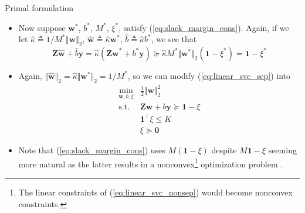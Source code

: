 \documentclass{beamer}
\numberwithin{equation}{section}
\newcommand{\aref}[1]{\alert{\ref{#1}}}
\begin{document}
\begin{frame}{Primal formulation}
    \begin{itemize}
        \item
        Now suppose $ \mathbf{w}^* $,  $ b^* $, $ M^* $, $ \xi^* $, satisfy
        (\aref{eq:slack_margin_cons}). Again, if we let $ \hat{\kappa}
        \triangleq 1 / M^*\Vert\mathbf{w}\Vert_2 $, $ \hat{\mathbf{w}}
        \triangleq \hat{\kappa}\mathbf{w}^* $, $ \hat{b} \triangleq
        \hat{\kappa}b^* $, we see that
        \begin{equation*}
            \mathbf{Z}\hat{\mathbf{w}} + \hat{b}\mathbf{y} =
            \hat{\kappa}(\mathbf{Zw}^* + b^*\mathbf{y}) \succeq
            \hat{\kappa}M^*\Vert\mathbf{w}^*\Vert_2(\mathbf{1} - \xi^*) =
            \mathbf{1} - \xi^*
        \end{equation*}

        \item
        Again, $ \Vert\hat{\mathbf{w}}\Vert_2 =
        \hat{\kappa}\Vert\mathbf{w}^*\Vert_2 = 1 / M^* $, so we can modify
        (\aref{eq:linear_svc_sep}) into
        \begin{equation} \label{eq:linear_svc_nonsep}
            \begin{array}{ll}
                \displaystyle\min_{\mathbf{w}, b, \xi} &
                \frac{1}{2}\Vert\mathbf{w}\Vert_2^2 \\
                \text{s.t.} & 
                \mathbf{Zw} + b\mathbf{y} \succeq \mathbf{1} - \xi \\
                & \mathbf{1}^\top\xi \le K \\
                & \xi \succeq \mathbf{0}
            \end{array}
        \end{equation}

        \item
        Note that (\aref{eq:slack_margin_cons}) uses $ M(\mathbf{1} - \xi) $
        despite $ M\mathbf{1} - \xi $ seeming more natural as the latter
        results in a nonconvex\footnote{
            The linear constraints of (\aref{eq:linear_svc_nonsep}) would
            become nonconvex constraints.
        } optimization problem \cite{esl}.
    \end{itemize}
\end{frame}
\end{document}
